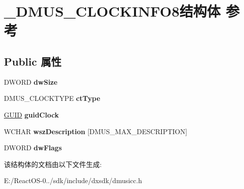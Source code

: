 \hypertarget{struct___d_m_u_s___c_l_o_c_k_i_n_f_o8}{}\section{\+\_\+\+D\+M\+U\+S\+\_\+\+C\+L\+O\+C\+K\+I\+N\+F\+O8结构体 参考}
\label{struct___d_m_u_s___c_l_o_c_k_i_n_f_o8}
\subsection*{Public 属性}
\begin{DoxyCompactItemize}
\item 
\mbox{\label{struct___d_m_u_s___c_l_o_c_k_i_n_f_o8_a85b43a429fd34f074982051a0a99c710}} 
D\+W\+O\+RD {\bfseries dw\+Size}
\item 
\mbox{\label{struct___d_m_u_s___c_l_o_c_k_i_n_f_o8_aa6c6330b91eead7af90a4fb7541de46a}} 
D\+M\+U\+S\+\_\+\+C\+L\+O\+C\+K\+T\+Y\+PE {\bfseries ct\+Type}
\item 
\mbox{\label{struct___d_m_u_s___c_l_o_c_k_i_n_f_o8_a9f77b1aa370f1ce21d754c37e333f9d0}} 
\hyperlink{interface_g_u_i_d}{G\+U\+ID} {\bfseries guid\+Clock}
\item 
\mbox{\label{struct___d_m_u_s___c_l_o_c_k_i_n_f_o8_a0ff87f654dc161535615b29546c9cda4}} 
W\+C\+H\+AR {\bfseries wsz\+Description} \mbox{[}D\+M\+U\+S\+\_\+\+M\+A\+X\+\_\+\+D\+E\+S\+C\+R\+I\+P\+T\+I\+ON\mbox{]}
\item 
\mbox{\label{struct___d_m_u_s___c_l_o_c_k_i_n_f_o8_a31bc66a4a4c0a2ea8053b9c6a629b88e}} 
D\+W\+O\+RD {\bfseries dw\+Flags}
\end{DoxyCompactItemize}


该结构体的文档由以下文件生成\+:\begin{DoxyCompactItemize}
\item 
E\+:/\+React\+O\+S-\/0../sdk/include/dxsdk/dmusicc.\+h\end{DoxyCompactItemize}
